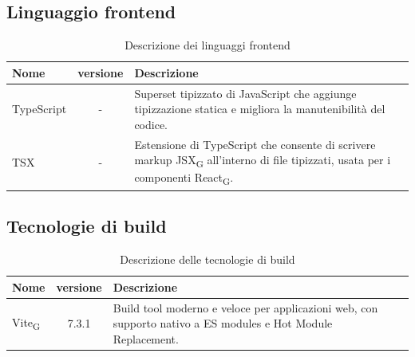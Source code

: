 \documentclass[11pt,a4paper]{article}
\newcommand{\gls}[1]{#1\textsubscript{G}}
\begin{document}
\subsection{Linguaggio frontend}
    \begin{table}[H]
        \centering
        \begin{tabular}{|l|c|>{\raggedright\arraybackslash}p{}|p{}|}
            \hline
            \textbf{Nome} & \textbf{versione} & \textbf{Descrizione} \\
            \hline
            TypeScript & - & Superset tipizzato di JavaScript che aggiunge tipizzazione statica e migliora la manutenibilità del codice. \\
            \hline
            TSX & - & Estensione di TypeScript che consente di scrivere markup \gls{JSX} all'interno di file tipizzati, usata per i componenti \gls{React}. \\
            \hline
        \end{tabular}
        \caption{Descrizione dei linguaggi frontend}
        \label{tab:linguaggi_frontend}
    \end{table}
\subsection{Tecnologie di build}
    \begin{table}[H]
        \centering
        \begin{tabular}{|l|c|>{\raggedright\arraybackslash}p{}|p{}|}
            \hline
            \textbf{Nome} & \textbf{versione} & \textbf{Descrizione} \\
            \hline
            \gls{Vite} & 7.3.1 & Build tool moderno e veloce per applicazioni web, con supporto nativo a ES modules e Hot Module Replacement. \\
            \hline
        \end{tabular}
        \caption{Descrizione delle tecnologie di build}
        \label{tab:tecnologie_build}
    \end{table}
\end{document}
